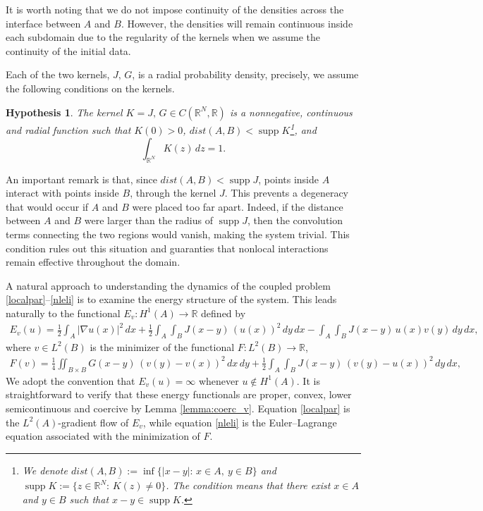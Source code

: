\documentclass[reqno]{amsart}
\numberwithin{equation}{section}
\newtheorem{hypothesis}{Hypothesis}
\begin{document}
It is worth noting that we do not impose continuity of the densities across the interface between $A$ and $B$. However, the densities will remain continuous inside each subdomain due to the regularity of the kernels when we assume the continuity of the initial data. 

Each of the two kernels, $J,\,G$, is a radial probability density, precisely, we assume the following conditions on the kernels. 

\begin{hypothesis}\label{hypo}
The kernel $K = J,\,G \in C(\mathbb{R}^N,\mathbb{R})$ is a nonnegative, continuous and radial function such that 
$K(0) > 0$, $dist(A,B) < \operatorname{supp} K$\footnote{We denote $dist(A,B):=\inf\{|x-y|:\,x\in A,\ y\in B\}$ and 
$\operatorname{supp}K:=\overline{\{z\in\mathbb{R}^N:\,K(z)\neq0\}}$. 
The condition means that there exist $x\in A$ and $y\in B$ such that $x-y\in \operatorname{supp}K$.}, and
\[
\int_{\mathbb{R}^N} K(z)\,dz = 1.
\]
\end{hypothesis}

An important remark is that, since $dist(A,B) <  \operatorname{supp} J$, points inside $A$ interact
with points inside $B$, through the kernel $J$. 
This prevents a degeneracy that would occur if $A$ and $B$ were placed too far apart. 
Indeed, if the distance between $A$ and $B$ were larger than the radius of $\operatorname{supp} J$, then the convolution terms connecting the two regions would vanish, making the system trivial. 
This condition rules out this situation and guaranties that nonlocal interactions remain effective throughout the domain.

A natural approach to understanding the dynamics of the coupled problem \eqref{localpar}--\eqref{nleli} is to examine the energy structure of the system. This leads naturally to the functional $E_v : H^1(A) \to \mathbb{R}$ defined by
\begin{align}\label{Eintro}
E_v(u)
= \frac12\int_A |\nabla u(x)|^2\,dx
  + \frac12\int_A\int_B J(x-y)\,(u(x))^2\,dy\,dx
  - \int_A\int_B J(x-y)\,u(x)v(y)\,dy\,dx,\end{align}
where \(v \in L^2(B)\) is the minimizer of the functional \(F : L^2(B)\to \mathbb{R}\),
\begin{align}\label{Fintro}
F(v)
= \frac14 \iint_{B\times B} G(x-y)\,(v(y)-v(x))^2\,dx\,dy
  + \frac12\int_A\int_B J(x-y)\,(v(y)-u(x))^2\,dy\,dx,
\end{align}
We adopt the convention that $E_v(u)=\infty$ whenever $u \notin H^1(A)$. 
It is straightforward to verify that these energy functionals are proper, convex, lower semicontinuous
and coercive by Lemma \ref{lemma:coerc_v}. Equation \eqref{localpar} is the \(L^2(A)\)-gradient flow of \(E_v\), while equation \eqref{nleli} is the Euler--Lagrange equation associated with the minimization of \(F\). 
\end{document}
